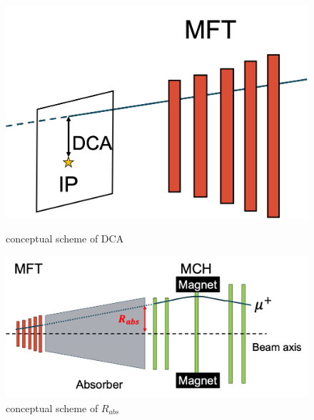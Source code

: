         \begin{figure}[htbp]
            \begin{minipage}{0.45\textwidth} %
                \centering
                \includegraphics[keepaspectratio, scale=0.15]{fig/3_3_DCA.png} %
                \caption{conceptual scheme of DCA}
                \label{Analysis:reco:DCA}
            \end{minipage}
            \hspace{0.5cm}
            \begin{minipage}{0.45\textwidth}
                \centering
                \includegraphics[keepaspectratio, scale=0.15]{fig/3_3_Rabs.png} %
                \caption{conceptual scheme of $R_{abs}$}
                \label{Analysis:reco:R_abs}
            \end{minipage}
        \end{figure}

